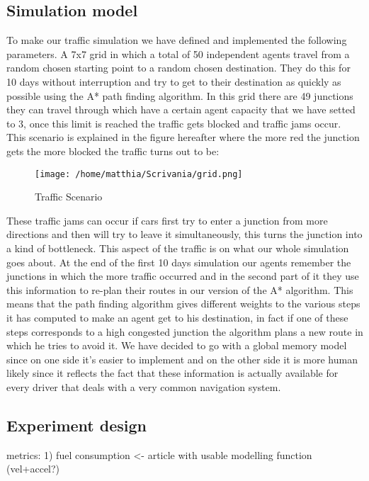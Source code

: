 \documentclass[a4paper,hidelinks]{article}
\begin{document}
\subsection{Simulation model}
To make our traffic simulation we have defined and implemented the following parameters. A 7x7 grid in which a total of 50 independent agents travel from a random chosen starting point to a random chosen destination. They do this for 10 days without interruption and try to get to their destination as quickly as possible using the A* path finding algorithm. In this grid there are 49 junctions they can travel through which have a certain agent capacity that we have setted to 3, once this limit is reached the traffic gets blocked and traffic jams occur. This scenario is explained in the figure hereafter where the more red the junction gets the more blocked the traffic turns out to be:

\begin{figure}[ht!]
\centering
\texttt{[image: /home/matthia/Scrivania/grid.png]}
\caption{Traffic Scenario \label{overflow}}
\end{figure} 


These traffic jams can occur if cars first try to enter a junction from more directions and then will try to leave it simultaneously, this turns the junction into a kind of bottleneck. This aspect of the traffic is on what our whole simulation goes about. At the end of the first 10 days simulation our agents remember the junctions in which the more traffic occurred and in the second part of it they use this information to re-plan their routes in our version of the A* algorithm. This means that the path finding algorithm gives different weights to the various steps it has computed to make an agent get to his destination, in fact if one of these steps corresponds to a high congested junction the algorithm plans a new route in which he tries to avoid it. We have decided to go with a global memory model since on one side it's easier to implement and on the other side it is more human likely since it reflects the fact that these information is actually available for every driver that deals with a very common navigation system. 

\subsection{Experiment design}


metrics: 1) fuel consumption <- article with usable modelling function (vel+accel?)
\end{document}
